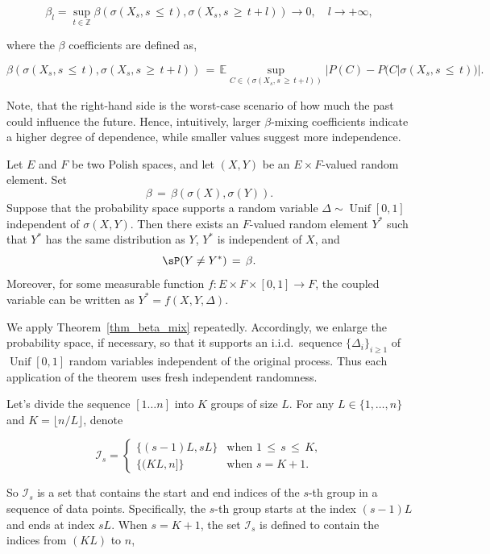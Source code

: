 \documentclass[twoside,11pt]{article}
\newenvironment{revision}{\color{revisionred}}{}
\begin{document}
\[
\beta_l = \sup_{t \in \mathbb{Z}} \beta (\sigma (X_s, s \,\leq\, t), \sigma (X_s, s \,\geq\, t + l)) \rightarrow 0, \quad l \rightarrow +\infty,
\]

where the \(\beta\) coefficients are defined as,

\[
\beta(\sigma(X_s, s \,\leq\, t), \sigma(X_s, s \,\geq\, t + l)) \,=\, \mathbb{E} \sup_{C \in (\sigma(X_s, s\,\geq\, t+l))} |P(C) - P(C | \sigma(X_s, s \,\leq\, t))|.
\]

Note, that the right-hand side is the worst-case scenario of how much the past could influence the future. Hence, intuitively, larger $\beta$-mixing coefficients indicate a higher degree of dependence, while smaller values suggest more independence.


\begin{revision}
\begin{theorem}
\label{thm_beta_mix}
Let $E$ and $F$ be two Polish spaces, and let $(X,Y)$ be an
$E\times F$-valued random element. Set
\[
\beta \,=\, \beta(\sigma(X),\sigma(Y)).
\]
Suppose that the probability space supports a random variable
$\Delta\sim\operatorname{Unif}[0,1]$ independent of $\sigma(X,Y)$.
Then there exists an $F$-valued random element $Y^*$ such that $Y^*$
has the same distribution as $Y$, $Y^*$ is independent of $X$, and
\[
\sP(Y\neq Y^*) \,=\, \beta.
\]
Moreover, for some measurable function
$f:E\times F\times[0,1]\to F$, the coupled variable can be written as
$Y^*=f(X,Y,\Delta)$.
\end{theorem}

We apply Theorem~\ref{thm_beta_mix} repeatedly. Accordingly, we enlarge
the probability space, if necessary, so that it supports an i.i.d.\
sequence $\{\Delta_i\}_{i\geq1}$ of
$\operatorname{Unif}[0,1]$ random variables independent of the original
process. Thus each application of the theorem uses fresh independent
randomness.
\end{revision}

Let's divide the sequence $[1\dots n]$ into $K$ groups of size $L$. For any \(L \in \{1, \ldots, n\}\) and \(K = \lfloor n/L \rfloor\), denote

\[
\mathcal{I}_s = 
\begin{cases}
\{ (s - 1)L, sL \} & \text{when } 1 \,\leq\, s \,\leq\, K, \\
\{ (KL, n] \} & \text{when } s = K + 1.
\end{cases}
\]

So $\mathcal{I}_s$ is a set that contains the start and end indices of the 
$s$-th group in a sequence of data points. Specifically, the 
$s$-th group starts at the index 
$(s-1)L$ and ends at index 
$sL$. When \(s = K + 1\), the set \(\mathcal{I}_s\) is defined to contain the indices from \((KL)\) to \(n\),
\end{document}
